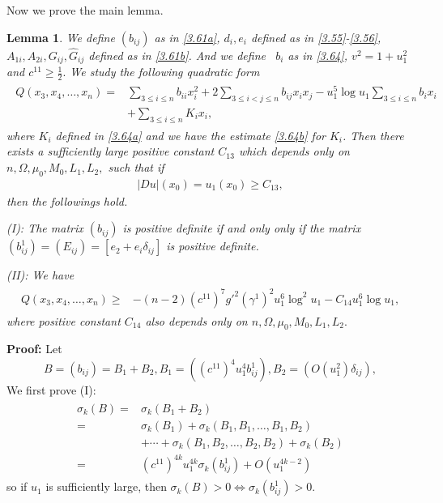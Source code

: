 \documentclass[11pt]{amsart}
\newtheorem{Lem}[Thm]{Lemma}
\numberwithin{equation}{section}
\begin{document}
Now we prove  the main lemma.
\begin{Lem}\label{Lem4.5}
We define $(b_{ij})$  as in \eqref{3.61a}, $d_i,e_i$ defined as in \eqref{3.55}-\eqref{3.56}, $A_{1i}, A_{2i}, G_{ij}, \hat{G}_{ij}$ defined as in \eqref{3.61b}.
And we define ~$b_i$  as in \eqref{3.64}, $v^2 = 1 + u_1^2$ and $c^{11}\ge \frac{1}{2}.$  We study the following quadratic form
\begin{align}\label{4.6}
\begin{split}
Q(x_3,x_4,\ldots,x_n)=&\sum_{3\leq i\leq n}b_{ii}x_i^2
+2\sum_{3\leq i< j\leq n}b_{ij}x_i x_j
-u_1^5\log u_1\sum_{3\leq i\leq n}b_{i} x_i\\
&+\sum_{3\leq i\leq n}K_i x_i,
\end{split}
\end{align}
where $K_i$ defined in  \eqref{3.64a} and we have the estimate  \eqref{3.64b} for $K_i$.
Then there exists a sufficiently large positive constant $C_{13}$ which depends only on  $n, \Omega, \mu_0, M_0, L_1, L_2,$ such that if
\begin{align}\label{4.6a}
|Du|(x_0)=u_1(x_0) \ge C_{13},
\end{align}
then  the followings hold.

(I): The matrix $(b_{ij})$ is positive definite if and only only if the matrix  ~$(b^1_{ij})=  (E_{ij})=[e_2+e_i\delta_{ij}]$ is positive definite.\par

(II): We have
\begin{align}\label{4.7}
\begin{split}
Q(x_3,x_4,\ldots,x_n)
\geq &-(n-2)(c^{11})^7g'^2(\gamma^1)^2u_1^6\log^2 u_1-C_{14} u_1^6\log u_1,
\end{split}
\end{align}
where positive constant $C_{14}$ also depends only on  $n, \Omega, \mu_0, M_0, L_1, L_2.$

\end{Lem}
{\bf Proof:} Let $$ B=(b_{ij})=B_1+B_2, B_1=((c^{11})^4u_1^4b^1_{ij}), B_2=(O(u^2_1)\delta_{ij}),$$
We first  prove  (I):
\begin{align}\label{4.8}
\begin{split}
\sigma_k(B)=&\sigma_k(B_1+B_2)\\
=&\sigma_k(B_1)+\sigma_k(B_1, B_1, \ldots, B_1, B_2)\\&+\cdots+\sigma_k(B_1, B_2,\ldots, B_2, B_2)+\sigma_k(B_2)\\
=&(c^{11})^{4k}u_1^{4k}\sigma_k(b^1_{ij})+O(u_1^{4k-2})
\end{split}
\end{align}
so if $u_1$ is sufficiently large, then $\sigma_k(B)>0\Longleftrightarrow\sigma_k(b^1_{ij})>0$.
\end{document}
